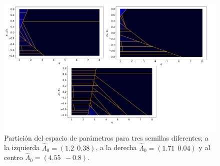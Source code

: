 \begin{figure}[h!]
\centering
\includegraphics[width=1.05\columnwidth ,trim={1.1cm, 1cm, 1cm, 1.2cm}]{figs/3_semillas_particion.png}
\caption{Partición del espacio de parámetros para tres semillas diferentes; a la izquierda $\hat{\Lambda}_0 = (1.2 \ \ 0.38)$, a la derecha $\hat{\Lambda}_0 = (1.71 \ \ 0.04)$ y al centro $\hat{\Lambda}_0 =(4.55 \ \ -0.8)$.}
\label{fig:seeds_part}
\end{figure}